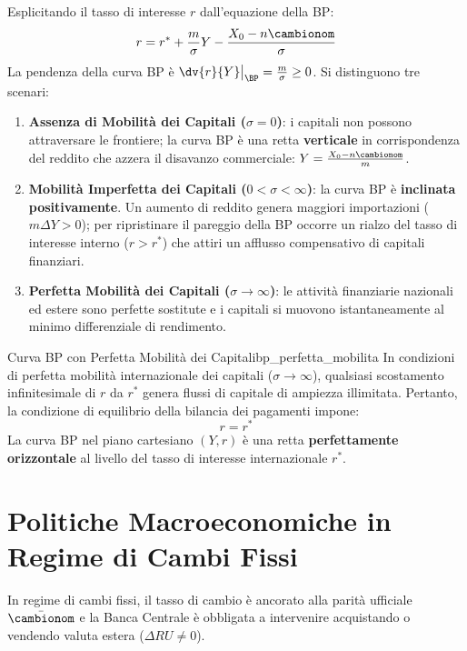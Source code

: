 Esplicitando il tasso di interesse $r$ dall'equazione della BP:
\begin{equation}
    r = r^* + \frac{m}{\sigma} Y - \frac{X_0 - n \cambionom}{\sigma}
\end{equation}
La pendenza della curva BP è $\dv{r}{Y}\big|_{\BP} = \frac{m}{\sigma} \ge 0$. Si distinguono tre scenari:
\begin{enumerate}
    \item \textbf{Assenza di Mobilità dei Capitali ($\sigma = 0$)}: i capitali non possono attraversare le frontiere; la curva BP è una retta \textbf{verticale} in corrispondenza del reddito che azzera il disavanzo commerciale: $Y = \frac{X_0 - n \cambionom}{m}$.
    \item \textbf{Mobilità Imperfetta dei Capitali ($0 < \sigma < \infty$)}: la curva BP è \textbf{inclinata positivamente}. Un aumento di reddito genera maggiori importazioni ($m \Delta Y > 0$); per ripristinare il pareggio della BP occorre un rialzo del tasso di interesse interno ($r > r^*$) che attiri un afflusso compensativo di capitali finanziari.
    \item \textbf{Perfetta Mobilità dei Capitali ($\sigma \to \infty$)}: le attività finanziarie nazionali ed estere sono perfette sostitute e i capitali si muovono istantaneamente al minimo differenziale di rendimento.
\end{enumerate}

\begin{teorema}{Curva BP con Perfetta Mobilità dei Capitali}{bp_perfetta_mobilita}
In condizioni di perfetta mobilità internazionale dei capitali ($\sigma \to \infty$), qualsiasi scostamento infinitesimale di $r$ da $r^*$ genera flussi di capitale di ampiezza illimitata. Pertanto, la condizione di equilibrio della bilancia dei pagamenti impone:
\begin{equation}
    r = r^* \label{eq:bp_orizzontale}
\end{equation}
La curva BP nel piano cartesiano $(Y, r)$ è una retta \textbf{perfettamente orizzontale} al livello del tasso di interesse internazionale $r^*$.
\end{teorema}

\section{Politiche Macroeconomiche in Regime di Cambi Fissi}

In regime di cambi fissi, il tasso di cambio è ancorato alla parità ufficiale $\bar{\cambionom}$ e la Banca Centrale è obbligata a intervenire acquistando o vendendo valuta estera ($\Delta RU \neq 0$).

